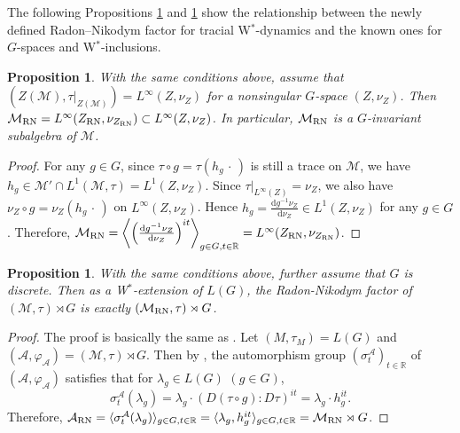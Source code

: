 \documentclass[12pt]{amsart}
\newcommand{\R}{{\mathbb R}}
\newcommand{\cM}{{\mathcal M}}
\newcommand{\RN}{{\rm RN}}
\def\d{\mathrm{d}}
\def\CA{\mathcal{A}}
\newtheorem{proposition}[thm]{Proposition}
\theoremstyle{definition}
\begin{document}
The following Propositions \ref{prop:Mrn=Zrn} and \ref{prop:Arn=Mrn} show the relationship between the newly defined Radon–Nikodym factor for tracial W$^*$-dynamics and the known ones for $G$-spaces and W$^*$-inclusions. 
\begin{proposition}\label{prop:Mrn=Zrn}
With the same conditions above, assume that $(Z(\cM),\tau|_{Z(\cM)})=L^\infty(Z,\nu_Z)$ for a nonsingular $G$-space $(Z,\nu_Z)$. Then $\cM_\RN=L^\infty(Z_\RN,\nu_{Z_\RN})\subset L^\infty(Z,\nu_Z)$. In particular, $\cM_\RN$ is a $G$-invariant subalgebra of $\cM$.
\end{proposition}
\begin{proof}
For any $g\in G$, since $\tau\circ g=\tau(h_g\,\cdot\,)$ is still a trace on $\cM$, we have $h_g\in \cM'\cap L^1(\cM,\tau)=L^1(Z,\nu_Z)$. Since $\tau|_{L^\infty(Z)}=\nu_Z$, we also have $\nu_Z\circ g=\nu_Z(h_g\,\cdot\,)$ on $L^\infty(Z,\nu_Z)$. Hence $h_g=\frac{\d g^{-1}\nu_Z}{\d\nu_Z}\in L^1(Z,\nu_Z)$ for any $g\in G$. Therefore, $\cM_\RN=\left\langle \left(\frac{\d g^{-1}\nu_Z}{\d\nu_Z}\right)^{it}\right\rangle_{g\in G,t\in \R}=L^\infty(Z_\RN,\nu_{Z_\RN})$.
\end{proof}

\begin{proposition}\label{prop:Arn=Mrn}
With the same conditions above, further assume that $G$ is discrete. Then as a W$^*$-extension of $L(G)$, the Radon-Nikodym factor of $(\cM,\tau)\rtimes G$ is exactly $(\cM_\RN,\tau)\rtimes G$.
\end{proposition}
\begin{proof}
The proof is basically the same as \cite[Example 3.5]{Zh23}. Let $(M,\tau_M)=L(G)$ and $(\CA,\varphi_\CA)=(\cM,\tau)\rtimes G$. Then by \cite[Theorem X.1.17]{TakesakiBookII}, the automorphism group $(\sigma_t^\CA)_{t\in\R}$ of $(\CA,\varphi_\CA)$ satisfies that for $\lambda_g\in L(G)$ $(g\in G)$,
$$\sigma_t^\CA(\lambda_g)=\lambda_g\cdot (D(\tau\circ g):D\tau)^{it}=\lambda_g\cdot h_g^{it}.$$
Therefore, $\CA_\RN=\langle \sigma^\CA_t(\lambda_g)\rangle_{g\in G,t\in\R}=\langle \lambda_g,h_g^{it}\rangle_{g\in G,t\in\R}=\cM_\RN\rtimes G$.
\end{proof}
\end{document}
